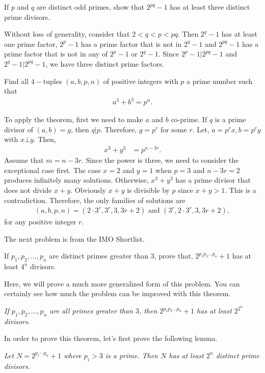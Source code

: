 \documentclass{subfile}
\begin{document}
		\begin{problem}
			If $p$ and $q$ are distinct odd primes, show that $2^{pq}-1$ has at least three distinct prime divisors.
		\end{problem}
		
		\begin{solution}
			Without loss of generality, consider that $2<q<p<pq$. Then $2^q-1$ has at least one prime factor, $2^p-1$ has a prime factor that is not in $2^q-1$ and $2^{pq}-1$ has a prime factor that is not in any of $2^p-1$ or $2^q-1$. Since $2^p-1|2^{pq}-1$ and $2^{q}-1|2^{pq}-1$, we have three distinct prime factors.
		\end{solution}
		
		
		\begin{problem}
			Find all $4-$tuples $(a,b,p,n)$ of positive integers with $p$ a prime number such that
				\begin{align*}
					a^3+b^3=p^n.
				\end{align*}
		\end{problem}
		
		\begin{solution}
			To apply the theorem, first we need to make $a$ and $b$ co-prime. If $q$ is a prime divisor of $(a,b)=g$, then $q|p$. Therefore, $g=p^r$ for some $r$. Let, $a=p^rx,b=p^ry$ with $x\bot y$. Then,
				\begin{align*}
					x^3+y^3 & = p^{n-3r}.
				\end{align*}
			Assume that $m=n-3r$. Since the power is three, we need to consider the exceptional case first. The case $x=2$ and $y=1$ when $p=3$ and $n-3r=2$ produces infinitely many solutions. Otherwise, $x^3+y^3$ has a prime divisor that does not divide $x+y$. Obviously $x+y$ is divisible by $p$ since $x+y>1$. This is a contradiction. Therefore, the only families of solutions are
				\begin{align*}
					(a,b,p,n)=(2\cdot 3^r,3^r,3,3r+2) \text{ and }(3^r,2\cdot 3^r,3,3r+2),
				\end{align*}
			for any positive integer $r$.
		\end{solution}
		
	The next problem is from the IMO Shortlist.
		\begin{problem}
			If $p_1,p_2,\dots,p_n$ are distinct primes greater than $3$, prove that, $2^{p_1p_2\dots p_n}+1$ has at least $4^n$ divisors.
		\end{problem}
	Here, we will prove a much more generalized form of this problem.  You can certainly see how much the problem can be improved with this theorem.
		\begin{theorem}\slshape
			If $p_1,p_2,\dots,p_n$ are all primes greater than $3$, then $2^{p_1p_2\dots p_n}+1$ has at least $2^{2^n}$ divisors.
		\end{theorem}
	In order to prove this theorem, let's first prove the following lemma.
		\begin{lemma}\slshape
			Let $N=2^{p_1\cdots p_n}+1$ where $p_i>3$ is a prime. Then $N$ has at least $2^n$ distinct prime divisors.
		\end{lemma}
		
\end{document}
